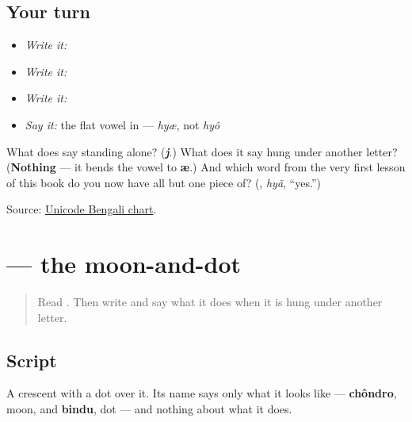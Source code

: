 \subsection*{Your turn}
\begin{itemize}
\raggedright
  \item \emph{Write it:} 
  \item \emph{Write it:}   
  \item \emph{Write it:} 
  \item \emph{Say it:} the flat vowel in \textbf{} — \emph{hyæ}, not \emph{hyô}
\end{itemize}

\begin{tcolorbox}[breakable,colback=teal!4,colframe=teal!35!black,title={Before you move on}]
What does \textbf{} say standing alone? (\emph{\textbf{j}}.) What does it say hung under another letter? (\textbf{Nothing} — it bends the vowel to \textbf{æ}.) And which word from the very first lesson of this book do you now have all but one piece of? (\textbf{}, \emph{hyã}, \textquotedblleft{}yes.\textquotedblright{})

Source: \href{https://www.unicode.org/charts/PDF/U0980.pdf}{Unicode Bengali chart}.
\end{tcolorbox}
\section[\texorpdfstring{\bn{ঁ} ((chôndrobindu))}{ঁ ((chôndrobindu))}]{ — the moon-and-dot}

\label{lesson:BN-W02-chandrabindu}



\begin{quote}
Read \textbf{}. Then write \textbf{} and say what it does when it is hung under another letter.
\end{quote}

\subsection*{Script}

\begin{quote}
\end{quote}

A crescent with a dot over it. Its name says only what it looks like — \textbf{chôndro}, moon, and \textbf{bindu}, dot — and nothing about what it does.

